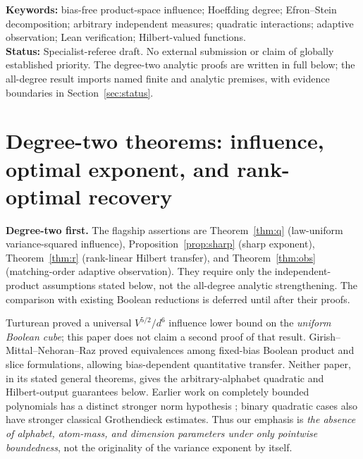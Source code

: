 \documentclass[11pt,letterpaper]{article}
\theoremstyle{definition}\newtheorem{definition}[theorem]{Definition}
\begin{document}
\noindent\textbf{Keywords:} bias-free product-space influence; Hoeffding degree; Efron--Stein decomposition; arbitrary independent measures; quadratic interactions; adaptive observation; Lean verification; Hilbert-valued functions.\\
\textbf{Status:} Specialist-referee draft. No external submission or claim of globally established priority. The degree-two analytic proofs are written in full below; the all-degree result imports named finite and analytic premises, with evidence boundaries in Section~\ref{sec:status}.

\section{Degree-two theorems: influence, optimal exponent, and rank-optimal recovery}

\noindent\textbf{Degree-two first.} The flagship assertions are Theorem~\ref{thm:q} (law-uniform variance-squared influence), Proposition~\ref{prop:sharp} (sharp exponent), Theorem~\ref{thm:r} (rank-linear Hilbert transfer), and Theorem~\ref{thm:obs} (matching-order adaptive observation). They require only the independent-product assumptions stated below, not the all-degree analytic strengthening. The comparison with existing Boolean reductions is deferred until after their proofs.\par\medskip
Turturean \cite{Turturean2026} proved a universal $V^{5/2}/d^6$ influence lower bound on the \emph{uniform Boolean cube}; this paper does not claim a second proof of that result. Girish--Mittal--Nehoran--Raz \cite{GMNR2026} proved equivalences among fixed-bias Boolean product and slice formulations, allowing bias-dependent quantitative transfer. Neither paper, in its stated general theorems, gives the arbitrary-alphabet quadratic and Hilbert-output guarantees below. Earlier work on completely bounded polynomials has a distinct stronger norm hypothesis \cite{EG2023,EGSP2026}; binary quadratic cases also have stronger classical Grothendieck estimates. Thus our emphasis is \emph{the absence of alphabet, atom-mass, and dimension parameters under only pointwise boundedness}, not the originality of the variance exponent by itself.
\end{document}
